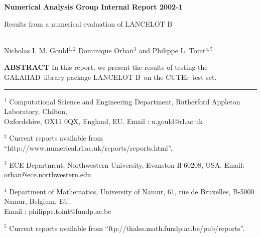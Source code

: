 \documentclass[11pt,twoside]{article}
\title{\papertitle}
\author{\paperauthor}
\newcommand{\gal}{{\sf GALAHAD}}
\newcommand{\lanb}{{\sf LANCELOT B}}
\newcommand{\cuter}{{\sf CUTEr}}
\newcommand{\theabstract}{In this report, we present the 
results of testing the \gal\ library package \lanb\ on the \cuter\ test set.}
\begin{document}
%


\begin{titlepage}

\begin{flushright} {\large \bf Numerical Analysis Group Internal Report 2002-1} \end{flushright}           
\vspace*{0.2 cm}

{\LARGE \bf
\begin{center}
Results from a numerical evaluation of \lanb
\end{center}}
\vspace*{0.1 cm}
\begin{center}
\mbox{} \\
      Nicholas I. M. Gould$^{1,2}$
      Dominique Orban$^{3}$
      and
      Philippe L. Toint$^{4,5}$
\\
\end{center}

\vspace{0.4cm}

\begin{center}
\parbox{\textwidth}{
{
{\bf  ABSTRACT \newline}
\theabstract}
}
\end{center}

\vspace{0.2 cm}

\noindent \rule{\textwidth}{0.001in}
\vspace{0.1 cm}

{\small
\begin{description}
\item  $^1$ Computational Science and Engineering Department,
       Rutherford Appleton Laboratory, 
       Chilton, \\ Oxfordshire, OX11 0QX, England, EU. 
       Email : n.gould@rl.ac.uk
\item  $^2$ Current reports available from %
       ``http://www.numerical.rl.ac.uk/reports/reports.html''.
\item $^3$ ECE Department,  Northwestern University, Evanston Il 60208, USA. 
       Email: orban@ece.northwestern.edu
\item  $^4$ Department of Mathematics, University of Namur, 
       61, rue de Bruxelles, B-5000 Namur, Belgium, EU. \\
       Email : philippe.toint@fundp.ac.be
\item  $^5$ Current reports available from %
       ``ftp://thales.math.fundp.ac.be/pub/reports''.
\end{description}
}


\end{titlepage}
\end{document}

